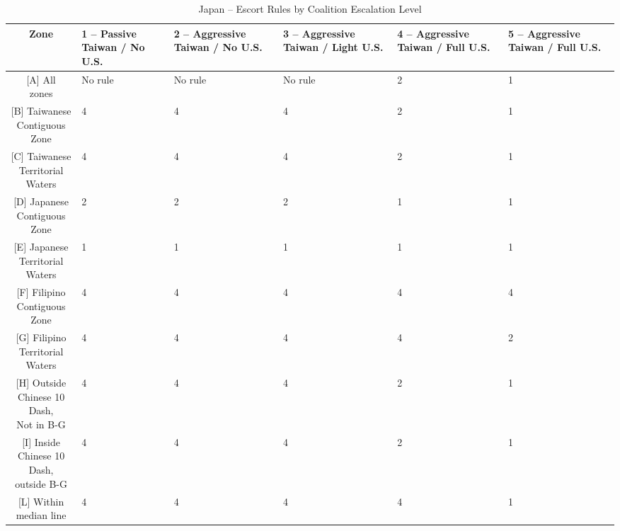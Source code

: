 \documentclass{article}
\begin{document}
\begin{table}[H]
\centering
\begin{tabularx}{\textwidth}{|c|X|X|X|X|X|}
\hline
\textbf{Zone} & \textbf{1 -- Passive Taiwan / No U.S.} & \textbf{2 -- Aggressive Taiwan / No U.S.} & \textbf{3 -- Aggressive Taiwan / Light U.S.} & \textbf{4 -- Aggressive Taiwan / Full U.S.} & \textbf{5 -- Aggressive Taiwan / Full U.S.} \\ 
\hline
\makecell{[A] All \\ zones} & No rule & No rule & No rule & 2 & 1 \\ 
\hline
\makecell{[B] Taiwanese \\ Contiguous Zone} & 4 & 4 & 4 & 2 & 1 \\ 
\hline
\makecell{[C] Taiwanese \\ Territorial Waters} & 4 & 4 & 4 & 2 & 1 \\ 
\hline
\makecell{[D] Japanese \\ Contiguous Zone} & 2 & 2 & 2 & 1 & 1 \\ 
\hline
\makecell{[E] Japanese \\ Territorial Waters} & 1 & 1 & 1 & 1 & 1 \\ 
\hline
\makecell{[F] Filipino \\ Contiguous Zone} & 4 & 4 & 4 & 4 & 4 \\ 
\hline
\makecell{[G] Filipino \\ Territorial Waters} & 4 & 4 & 4 & 4 & 2 \\ 
\hline
\makecell{[H] Outside \\ Chinese 10 Dash, \\ Not in B-G} & 4 & 4 & 4 & 2 & 1 \\ 
\hline
\makecell{[I] Inside \\ Chinese 10 Dash, \\ outside B-G} & 4 & 4 & 4 & 2 & 1 \\ 
\hline
\makecell{[L] Within \\ median line} & 4 & 4 & 4 & 4 & 1 \\ 
\hline
\end{tabularx}
\caption{Japan -- Escort Rules by Coalition Escalation Level}
\end{table}
\end{document}
